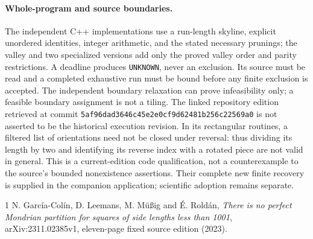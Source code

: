 \documentclass[11pt]{article}
\begin{document}
\paragraph{Whole-program and source boundaries.}
The independent C++ implementations use a
run-length skyline, explicit unordered identities, integer arithmetic, and the
stated necessary prunings; the valley and two specialized versions add only
the proved valley order and parity restrictions. A deadline produces \texttt{UNKNOWN}, never an
exclusion. Its source must be read and a completed exhaustive run must be bound
before any finite exclusion is accepted. The independent boundary relaxation
can prove infeasibility only; a feasible boundary assignment is not a tiling.
The linked repository edition retrieved at commit
\texttt{5af96dad3646c45e2e0cf9d62481b256c22569a0} is not asserted to be the
historical execution revision. In its rectangular routines, a filtered list of
orientations need not be closed under reversal: thus dividing its length by two
and identifying its reverse index with a rotated piece are not valid in general.
This is a current-edition code qualification, not a counterexample to the source's
bounded nonexistence assertions. Their complete new finite recovery is supplied in the companion application;
scientific adoption remains separate.

\begin{thebibliography}{1}
 N. Garc\'ia-Col\'in, D. Leemans, M. M\"u\ss ig and \'E. Rold\'an,
\emph{There is no perfect Mondrian partition for squares of side lengths less
than 1001}, arXiv:2311.02385v1, eleven-page fixed source edition (2023).
\end{thebibliography}
\end{document}

